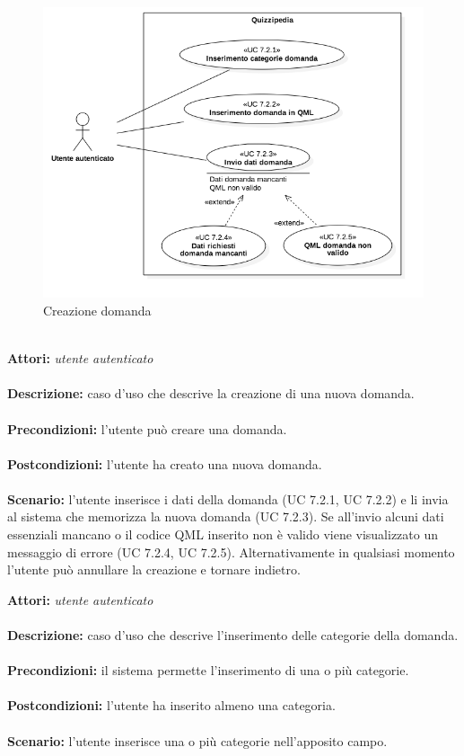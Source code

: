\documentclass[a4paper,11pt]{article}
\begin{document}
\begin{figure}[h!]
\centering
\includegraphics[scale=0.6]{../immagini/UC7_2.png}
\caption{Creazione domanda}
\end{figure}
\ \\
\textbf{Attori:} \textit{utente autenticato}
\\ \\
\textbf{Descrizione:} caso d'uso che descrive la creazione di una nuova domanda.\\
\\
\textbf{Precondizioni:} l'utente può creare una domanda.\\
\\
\textbf{Postcondizioni:} l’utente ha creato una nuova domanda.\\
\\
\textbf{Scenario:} l’utente inserisce i dati della domanda (UC 7.2.1, UC 7.2.2) e li invia al sistema che memorizza la nuova domanda (UC 7.2.3). Se all'invio alcuni dati essenziali mancano o il codice QML inserito non è valido viene visualizzato un messaggio di errore (UC 7.2.4, UC 7.2.5). Alternativamente in qualsiasi momento l'utente può annullare la creazione e tornare indietro.\\



\textbf{Attori:} \textit{utente autenticato}
\\ \\
\textbf{Descrizione:} caso d'uso che descrive l'inserimento delle categorie della domanda.\\
\\
\textbf{Precondizioni:} il sistema permette l'inserimento di una o più categorie.\\
\\
\textbf{Postcondizioni:} l’utente ha inserito almeno una categoria.\\
\\
\textbf{Scenario:} l’utente inserisce una o più categorie nell'apposito campo.\\
\end{document}
